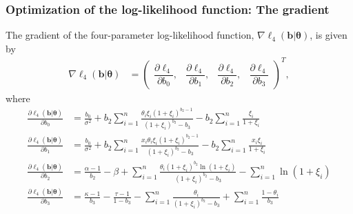 \documentclass[11pt, letterpaper]{article}
\begin{document}
\subsubsection{Optimization of the log-likelihood function: The gradient}
The gradient of the four-parameter log-likelihood function, $\nabla \ell_4(\bm b | \bm \theta)$, is given by
\begin{align*}
\nabla \ell_4(\bm b | \bm \theta) &= \begin{pmatrix}
\dfrac{\partial \ell_4}{\partial b_0},   & \dfrac{\partial \ell_4}{\partial b_1} , & \dfrac{\partial \ell_4}{\partial b_2} , & \dfrac{\partial \ell_4}{\partial b_3}
\end{pmatrix}^T,
\end{align*}
where 
\begin{align*}
\frac{\partial \ell_4 (\bm b | \bm \theta)}{\partial b_0}   &= \frac{b_0}{\sigma^2} + b_2\sum_{i=1}^n \frac{\theta_i \xi_i (1+\xi_i)^{b_2-1}}{(1+\xi_i)^{b_2}-b_3} - b_2\sum_{i=1}^n \frac{\xi_i}{1+\xi_i}
\\
\frac{\partial \ell_4 (\bm b | \bm \theta)}{\partial b_1}   &= \frac{b_0}{\sigma^2} + b_2\sum_{i=1}^n \frac{x_i\theta_i \xi_i (1+\xi_i)^{b_2-1}}{(1+\xi_i)^{b_2}-b_3} - b_2\sum_{i=1}^n \frac{x_i\xi_i}{1+\xi_i}
\\
\frac{\partial \ell_4 (\bm b | \bm \theta)}{\partial b_2}   &= \frac{\alpha-1}{b_2} - \beta + \sum_{i=1}^n \frac{\theta_i (1+\xi_i)^{b_2}\ln(1+\xi_i)}{(1+\xi_i)^{b_2}-b_3}  -\sum_{i=1}^n  \ln (1+\xi_i) \\
\frac{\partial \ell_4 (\bm b | \bm \theta)}{\partial b_3}   &= \frac{\kappa-1}{b_3} -\frac{\tau -1}{1-b_3 } -\sum_{i=1}^n \frac{\theta_i}{(1 + \xi_i)^{b_2} - b_3 } + \sum_{i=1}^n \frac{1-\theta_i}{b_3} \\
\end{align*}
\end{document}
